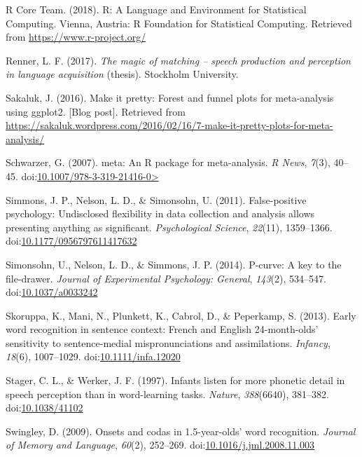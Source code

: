 \documentclass[man]{apa6}
\begin{document}
\leavevmode\hypertarget{ref-R}{}%
R Core Team. (2018). R: A Language and Environment for Statistical Computing. Vienna, Austria: R Foundation for Statistical Computing. Retrieved from \url{https://www.r-project.org/}

\leavevmode\hypertarget{ref-Renner2017}{}%
Renner, L. F. (2017). \emph{The magic of matching -- speech production and perception in language acquisition} (thesis). Stockholm University.

\leavevmode\hypertarget{ref-Sakaluk2016}{}%
Sakaluk, J. (2016). Make it pretty: Forest and funnel plots for meta-analysis using ggplot2. {[}Blog post{]}. Retrieved from \url{https://sakaluk.wordpress.com/2016/02/16/7-make-it-pretty-plots-for-meta-analysis/}

\leavevmode\hypertarget{ref-meta}{}%
Schwarzer, G. (2007). meta: An R package for meta-analysis. \emph{R News}, \emph{7}(3), 40--45. doi:\href{https://doi.org/10.1007/978-3-319-21416-0\%3E}{10.1007/978-3-319-21416-0\textgreater{}}

\leavevmode\hypertarget{ref-Simmons2011}{}%
Simmons, J. P., Nelson, L. D., \& Simonsohn, U. (2011). False-positive psychology: Undisclosed flexibility in data collection and analysis allows presenting anything as significant. \emph{Psychological Science}, \emph{22}(11), 1359--1366. doi:\href{https://doi.org/10.1177/0956797611417632}{10.1177/0956797611417632}

\leavevmode\hypertarget{ref-pcurve}{}%
Simonsohn, U., Nelson, L. D., \& Simmons, J. P. (2014). P-curve: A key to the file-drawer. \emph{Journal of Experimental Psychology: General}, \emph{143}(2), 534--547. doi:\href{https://doi.org/10.1037/a0033242}{10.1037/a0033242}

\leavevmode\hypertarget{ref-Skoruppa2013}{}%
Skoruppa, K., Mani, N., Plunkett, K., Cabrol, D., \& Peperkamp, S. (2013). Early word recognition in sentence context: French and English 24-month-olds' sensitivity to sentence-medial mispronunciations and assimilations. \emph{Infancy}, \emph{18}(6), 1007--1029. doi:\href{https://doi.org/10.1111/infa.12020}{10.1111/infa.12020}

\leavevmode\hypertarget{ref-Stager1997}{}%
Stager, C. L., \& Werker, J. F. (1997). Infants listen for more phonetic detail in speech perception than in word-learning tasks. \emph{Nature}, \emph{388}(6640), 381--382. doi:\href{https://doi.org/10.1038/41102}{10.1038/41102}

\leavevmode\hypertarget{ref-Swingley2009}{}%
Swingley, D. (2009). Onsets and codas in 1.5-year-olds' word recognition. \emph{Journal of Memory and Language}, \emph{60}(2), 252--269. doi:\href{https://doi.org/10.1016/j.jml.2008.11.003}{10.1016/j.jml.2008.11.003}
\end{document}
